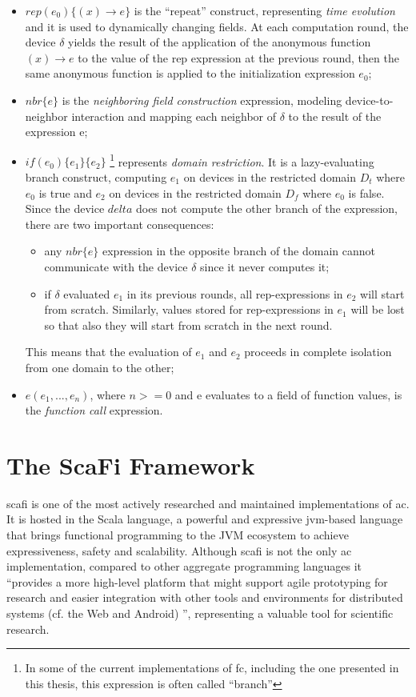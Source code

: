 \begin{itemize}
    \item $rep(e_0)\{(x) \rightarrow e\}$ is the ``repeat'' construct, representing \textit{time evolution} and it is used to dynamically changing fields. At each computation round,
          the device $\delta$ yields the result of the application of the anonymous function $(x) \rightarrow e$ to the value of the rep expression at the previous round, then the same anonymous function is
          applied to the initialization expression $e_0$;
    \item $nbr\{e\}$ is the \textit{neighboring field construction} expression, modeling device-to-neighbor interaction and mapping each neighbor of $\delta$ to the result of the expression e;
    \item $if(e_0)\{e_1\}\{e_2\}$ \footnote[01]{In some of the current implementations of \ac{fc}, including the one presented in this thesis, this expression is often called ``branch''}
          represents \textit{domain restriction}. It is a lazy-evaluating branch construct, computing $e_1$ on devices in the restricted domain $D_t$ where $e_0$ is true and $e_2$ on devices in the restricted domain $D_f$ where $e_0$ is false.
          Since the device $delta$ does not compute the other branch of the expression, there are two important consequences:
          \begin{itemize}
              \item any $nbr\{e\}$ expression in the opposite branch of the domain cannot communicate with the device $\delta$ since it never computes it;
              \item if $\delta$ evaluated $e_1$ in its previous rounds, all rep-expressions in $e_2$ will start from scratch.
                    Similarly, values stored for rep-expressions in $e_1$ will be lost so that also they will start from scratch in the next round.
          \end{itemize}
          This means that the evaluation of $e_1$ and $e_2$ proceeds in complete isolation from one domain to the other;
    \item $e(e_1, ..., e_n)$, where $n>=0$ and e evaluates to a field of function values, is the \textit{function call} expression.
\end{itemize}



\section{The ScaFi Framework}
\ac{scafi} is one of the most actively researched and maintained implementations of \ac{ac}.
It is hosted in the Scala language, a powerful and expressive \ac{jvm}-based language that brings functional programming to the JVM ecosystem to achieve expressiveness, safety and scalability.
Although \ac{scafi} is not the only \ac{ac} implementation, compared to other aggregate programming languages it ``provides a more high-level platform that
might support agile prototyping for research and easier integration with other tools and environments for distributed systems
(cf. the Web and Android) \cite{10.1145/3285956}'', representing a valuable tool for scientific research.

